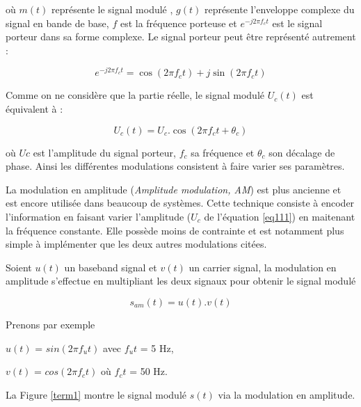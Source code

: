 où $m(t)$ représente le signal modulé , $g(t)$ représente l'enveloppe complexe du signal en bande de base, $f$ est la fréquence porteuse et $e^{-j2\pi f_c t}$ est le signal porteur dans sa forme complexe. Le signal porteur peut être représenté autrement :

\begin{equation}\label{eq111}
e^{-j2\pi f_c t} = \cos(2 \pi f_c t) + j \sin(2 \pi f_c t)
\end{equation}

Comme on ne considère que la partie réelle, le signal modulé $U_c(t)$ est équivalent à :

\begin{equation}\label{eq111}
U_c(t) = U_c . \cos(2 \pi f_c t + \theta_c)
\end{equation}

où $Uc$ est l'amplitude du signal porteur, $f_c$ sa fréquence et $\theta_c$ son décalage de phase. Ainsi les différentes modulations consistent à faire varier ses paramètres.

\vspace{0.1cm}

La modulation en amplitude (\textit{Amplitude modulation, AM}) est plus ancienne et est encore utilisée dans beaucoup de systèmes. Cette technique consiste à encoder l'information en faisant varier l'amplitude ($U_c$ de l'équation \ref{eq111}) en maitenant la fréquence constante. Elle possède moins de contrainte et est notamment plus simple à implémenter que les deux autres modulations citées.

\vspace{0.1cm}

Soient $u(t)$ un baseband signal et $v(t)$ un carrier signal, la modulation en amplitude s'effectue en multipliant les deux signaux pour obtenir le signal modulé 

\begin{equation}\label{eq2}
s_{am}(t) = u(t) . v(t)
\end{equation}

Prenons par exemple 

$u(t)$ = $sin(2\pi f_{u}t)$ avec $f_{u}t$ = 5 Hz,

$v(t)$ = $cos(2\pi f_{c}t)$ où $f_{c}t$ = 50 Hz.

La Figure \ref{term1} montre le signal modulé $s(t)$ via la modulation en amplitude.

\newpage

